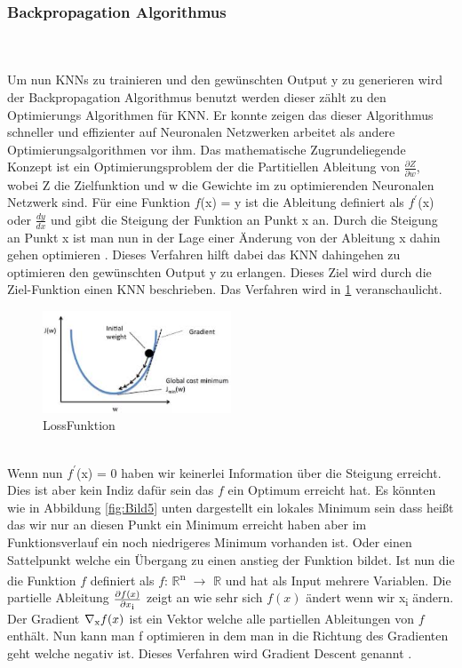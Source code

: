 \documentclass{llncs}
\begin{document}
\subsubsection{Backpropagation Algorithmus}\label{sec:test}
~\\\\
Um nun KNNs zu trainieren und den gewünschten Output y zu generieren wird der Backpropagation Algorithmus benutzt werden dieser zählt zu den Optimierungs Algorithmen für KNN. Er konnte zeigen das dieser Algorithmus schneller und effizienter auf Neuronalen Netzwerken arbeitet als andere Optimierungsalgorithmen vor ihm. Das mathematische Zugrundeliegende Konzept ist ein Optimierungsproblem der die Partitiellen Ableitung von  $\frac{\partial Z}{\partial w}$, wobei Z die Zielfunktion und w die Gewichte im zu optimierenden Neuronalen Netzwerk sind. Für eine Funktion $f$(x) = y ist die Ableitung definiert als $f^\prime$(x) oder $\frac{dy}{dx}$ und gibt die Steigung der Funktion an Punkt x an. Durch die Steigung an Punkt x ist man nun in der Lage einer Änderung von der Ableitung x dahin gehen optimieren \cite{Grundlagen}. Dieses Verfahren hilft dabei das KNN  dahingehen zu optimieren den gewünschten Output y zu erlangen. Dieses Ziel wird durch die Ziel-Funktion einen KNN beschrieben. Das Verfahren wird in \ref{fig:Bild6} veranschaulicht.   
\\
\begin{figure}[htbp] 
	\centering
	\includegraphics[width=0.5\textwidth]{gradient.png}
	\caption{LossFunktion}
	\label{fig:Bild6}
\end{figure}
\\
Wenn nun $f^\prime$(x) = 0 haben wir keinerlei Information über die Steigung erreicht. Dies ist aber kein Indiz dafür sein das $f$ ein Optimum erreicht hat. Es könnten wie in Abbildung \ref{fig:Bild5} unten dargestellt ein lokales Minimum sein dass heißt das wir nur an diesen Punkt ein Minimum erreicht haben aber im Funktionsverlauf ein noch niedrigeres Minimum vorhanden ist. Oder einen Sattelpunkt welche ein Übergang zu einen anstieg der Funktion bildet.
Ist nun die die Funktion $f$ definiert als $f$: $\mathbb{R}$\textsuperscript{n} $\rightarrow$  $\mathbb{R}$ und hat als Input mehrere Variablen. Die partielle Ableitung $\frac{\partial f(x)}{\partial x\textsubscript{i}}$ zeigt an wie sehr sich $f(x)$ ändert wenn wir x\textsubscript{i} ändern. Der Gradient $\nabla\textsubscript{x}f(x)$ ist ein Vektor welche alle partiellen Ableitungen von $f$ enthält. Nun kann man f optimieren in dem man in die Richtung des Gradienten geht welche negativ ist. Dieses Verfahren wird Gradient Descent genannt \cite{Grundlagen}.
\end{document}
